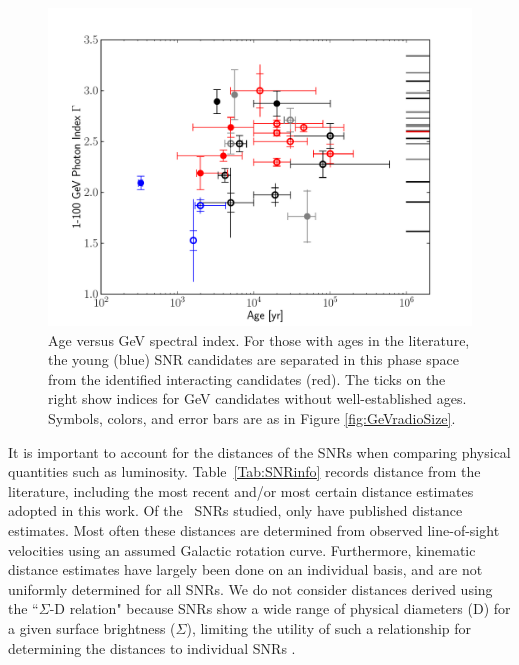 \begin{figure}[h]
	\centering
	\includegraphics[width=1.0\columnwidth]{Figures/age_vs_index.pdf}
	\caption[Age versus GeV spectral index]{Age versus GeV spectral index. For those with ages in the literature, the young (blue) SNR candidates are separated in this phase space from the identified interacting candidates (red). The ticks on the right show indices for GeV candidates without well-established ages. Symbols, colors, and error bars are as in Figure \ref{fig:GeVradioSize}. 
		\label{fig:AgeGeVIndex}}
\end{figure}

It is important to account for the distances of the SNRs when comparing physical quantities such as luminosity. Table~\ref{Tab:SNRinfo}  records distance from the literature, including the most recent and/or most certain distance estimates adopted in this work. Of the \nGalSNRs~SNRs studied, only \ndist{} have published distance estimates. Most often these distances are determined from observed line-of-sight velocities using an assumed Galactic rotation curve. Furthermore, kinematic distance estimates have largely been done on an individual basis, and are not uniformly determined for all SNRs. We do not consider distances derived using the ``$\Sigma$-D relation" because SNRs show a wide range of physical diameters (D) for a given surface brightness ($\Sigma$), limiting the utility of such a relationship for determining the distances to individual SNRs \citep{Green12-distances}.




